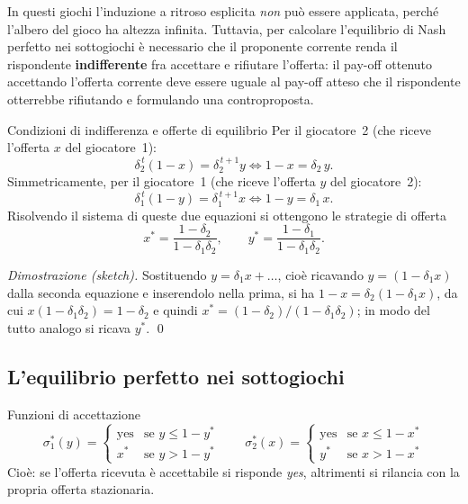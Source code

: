 \documentclass[12pt,a4paper,twoside]{book}
\theoremstyle{plain}
\theoremstyle{definition}
\begin{document}
In questi giochi l'induzione a ritroso esplicita \emph{non} può essere applicata, perché
l'albero del gioco ha altezza infinita. Tuttavia, per calcolare l'equilibrio di Nash perfetto
nei sottogiochi è necessario che il proponente corrente renda il rispondente
\textbf{indifferente} fra accettare e rifiutare l'offerta: il pay-off ottenuto accettando
l'offerta corrente deve essere uguale al pay-off atteso che il rispondente otterrebbe
rifiutando e formulando una controproposta.

\begin{thmbox}{Condizioni di indifferenza e offerte di equilibrio}
Per il giocatore~2 (che riceve l'offerta $x$ del giocatore~1):
\[
  \delta_2^{\,t}(1-x)=\delta_2^{\,t+1}y
  \iff
  1-x=\delta_2\,y .
\]
Simmetricamente, per il giocatore~1 (che riceve l'offerta $y$ del giocatore~2):
\[
  \delta_1^{\,t}(1-y)=\delta_1^{\,t+1}x
  \iff
  1-y=\delta_1\,x .
\]
Risolvendo il sistema di queste due equazioni si ottengono le strategie di offerta
\[
  x^*=\frac{1-\delta_2}{1-\delta_1\delta_2},
  \qquad
  y^*=\frac{1-\delta_1}{1-\delta_1\delta_2}.
\]
\end{thmbox}

\textit{Dimostrazione (sketch).} Sostituendo $y=\delta_1x+\ldots$, cioè ricavando
$y=(1-\delta_1x)$ dalla seconda equazione e inserendolo nella prima, si ha
$1-x=\delta_2(1-\delta_1x)$, da cui $x(1-\delta_1\delta_2)=1-\delta_2$ e quindi
$x^*=(1-\delta_2)/(1-\delta_1\delta_2)$; in modo del tutto analogo si ricava $y^*$. \qed

\subsection{L'equilibrio perfetto nei sottogiochi}

\begin{defbox}{Funzioni di accettazione}
\[
  \sigma_1^*(y)=
  \begin{cases}
    \text{yes} & \text{se } y\le 1-y^*\\[2pt]
    x^* & \text{se } y> 1-y^*
  \end{cases}
  \qquad
  \sigma_2^*(x)=
  \begin{cases}
    \text{yes} & \text{se } x\le 1-x^*\\[2pt]
    y^* & \text{se } x> 1-x^*
  \end{cases}
\]
Cioè: se l'offerta ricevuta è accettabile si risponde \emph{yes}, altrimenti si rilancia con
la propria offerta stazionaria.
\end{defbox}
\end{document}
